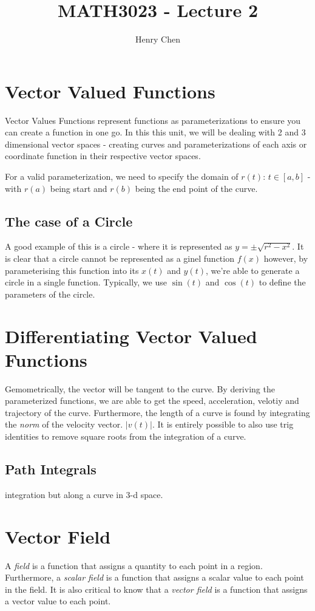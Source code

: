\documentclass[a4paper, 11pt]{article}
\title{
    \large \textbf{MATH3023 - Lecture 2}
}
\author{Henry Chen}
\begin{document}
\maketitle
\tableofcontents

\section{Vector Valued Functions}
Vector Values Functions represent functions as parameterizations to ensure you can create a function in one go. In this this unit, we will be dealing with 2 and 3 dimensional vector spaces - creating curves and parameterizations of each axis or coordinate function in their respective vector spaces. 

For a valid parameterization, we need to specify the domain of $r(t): \, t\in [a,b]$ - with $r(a)$ being start and $r(b)$ being the end point of the curve. 

\subsection{The case of a Circle}
A good example of this is a circle - where it is represented as $y=\pm\sqrt{r^2-x^2}$. It is clear that a circle cannot be represented as a ginel function $f(x)$ however, by parameterising this function into its $x(t)$ and $y(t)$, we're able to generate a circle in a single function. Typically, we use $\sin(t)$ and $\cos(t)$ to define the parameters of the circle.

\section{Differentiating Vector Valued Functions}
Gemometrically, the vector will be tangent to the curve. By deriving the parameterized functions, we are able to get the speed, acceleration, velotiy and trajectory of the curve. Furthermore, the length of a curve is found by integrating the \emph{norm} of the velocity vector. $|v(t)|$. It is entirely possible to also use trig identities to remove square roots from the integration of a curve. 

\subsection{Path Integrals}
integration but along a curve in 3-d space.

\section{Vector Field}
A \emph{field} is a function that assigns a quantity to each point in a region. Furthermore, a \emph{scalar field} is a function that assigns a scalar value to each point in the field. It is also critical to know that a \emph{vector field} is a function that assigns a vector value to each point. 
\end{document}
